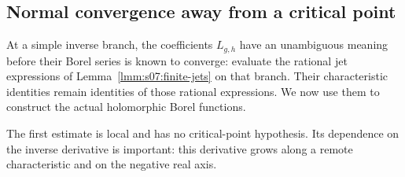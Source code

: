 \subsection{Normal convergence away from a critical point}
\label{subsec:b:regular}

At a simple inverse branch, the coefficients $L_{g,h}$ have an
unambiguous meaning before their Borel series is known to converge:
evaluate the rational jet expressions of
Lemma~\ref{lmm:s07:finite-jets} on that branch. Their characteristic
identities remain identities of those rational expressions. We now
use them to construct the actual holomorphic Borel functions.

The first estimate is local and has no critical-point hypothesis. Its
dependence on the inverse derivative is important: this derivative
grows along a remote characteristic and on the negative real axis.

